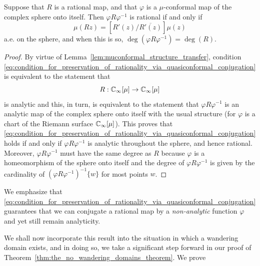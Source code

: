 \begin{lemma}
    \label{lem:preservation_of_rationality_via_quasiconformal_conjugation}
    Suppose that $R$ is a rational map, and that $\varphi$ is a $\mu$-conformal
    map of the complex sphere onto itself. Then $\varphi R \varphi^{-1}$ is
    rational if and only if
    \begin{equation}
        \label{eq:condition_for_preservation_of_rationality_via_quasiconformal_conjugation}
        \mu(Rz) = [R'(z)/\overline{R'(z)}]\mu(z)
    \end{equation}
    a.e. on the sphere, and when this is so, $\deg(\varphi R \varphi^{-1}) =
    \deg(R)$.
\end{lemma}
\begin{proof}
    By virtue of Lemma~\ref{lem:muconformal_structure_transfer}, condition
    \eqref{eq:condition_for_preservation_of_rationality_via_quasiconformal_conjugation}
    is equivalent to the statement that
    \begin{equation*}
        R: \mathbb{C}_\infty[\mu] \to \mathbb{C}_\infty[\mu]
    \end{equation*}
    is analytic and this, in turn, is equivalent to the statement that $\varphi
    R \varphi^{-1}$ is an analytic map of the complex sphere onto itself with
    the usual structure (for $\varphi$ is a chart of the Riemann surface
    $\mathbb{C}_\infty[\mu]$). This proves that
    \eqref{eq:condition_for_preservation_of_rationality_via_quasiconformal_conjugation}
    holds if and only if $\varphi R \varphi^{-1}$ is analytic throughout the
    sphere, and hence rational. Moreover, $\varphi R \varphi^{-1}$ must have the
    same degree as $R$ because $\varphi$ is a homeomorphism of the sphere onto
    itself and the degree of $\varphi R \varphi^{-1}$ is given by the
    cardinality of $(\varphi R \varphi^{-1})^{-1}\{w\}$ for most points $w$.
\end{proof}

We emphasize that
\eqref{eq:condition_for_preservation_of_rationality_via_quasiconformal_conjugation}
guarantees that we can conjugate a rational map by a \emph{non-analytic}
function $\varphi$ and yet still remain analyticity.

We shall now incorporate this result into the situation in which a wandering
domain exists, and in doing so, we take a significant step forward in our proof
of Theorem~\ref{thm:the_no_wandering_domains_theorem}. We prove

